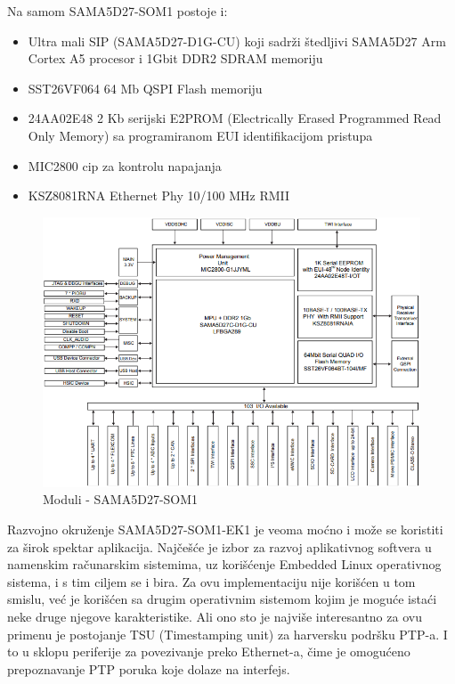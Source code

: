 \documentclass[a4paper,12pt, master]{etf}
\begin{document}
	Na samom SAMA5D27-SOM1 postoje i:
	\begin{itemize}
		\item Ultra mali SIP (SAMA5D27-D1G-CU) koji sadr\v{z}i \v{s}tedljivi
		SAMA5D27 Arm Cortex A5 procesor i 1Gbit DDR2 SDRAM memoriju
		\item SST26VF064 64 Mb QSPI Flash memoriju
		\item 24AA02E48 2 Kb serijski E2PROM (Electrically Erased Programmed
		Read Only Memory) sa programiranom EUI identifikacijom pristupa
		\item MIC2800 cip za kontrolu napajanja
		\item KSZ8081RNA Ethernet Phy 10/100 MHz RMII
	\end{itemize}

	\begin{figure}[htb]
			\centering
			\includegraphics[scale=.5]{../pic/hw_som_modules.PNG}
			\caption{Moduli - SAMA5D27-SOM1}
			\label{fig:hw_som_modules}
	\end{figure}

	Razvojno okru\v{z}enje SAMA5D27-SOM1-EK1 je veoma mo\'{c}no i mo\v{z}e se
	koristiti za \v{s}irok spektar aplikacija. Naj\v{c}e\v{s}\'{c}e je izbor za
	razvoj aplikativnog softvera u namenskim ra\v{c}unarskim sistemima, uz
	kori\v{s}\'{c}enje Embedded Linux operativnog sistema, i s tim ciljem se i
	bira. Za ovu implementaciju nije kori\v{s}\'{c}en u tom smislu,	ve\'{c} je
	kori\v{s}\'{c}en sa drugim operativnim sistemom kojim je mogu\'{c}e
	ista\'{c}i neke druge njegove karakteristike. Ali ono sto je najvi\v{s}e
	interesantno za ovu primenu je postojanje TSU (Timestamping unit) za
	harversku podr\v{s}ku PTP-a. I to u sklopu periferije za povezivanje preko
	Ethernet-a, \v{c}ime je omogu\'{c}eno prepoznavanje PTP poruka koje dolaze
	na interfejs.
\end{document}
